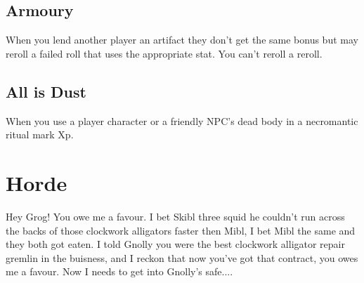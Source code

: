 \documentclass{tufte-book}
\begin{document}
\section{Armoury}
When you lend another player an artifact they don't get the same bonus but may reroll a failed roll that uses the appropriate stat. You can't reroll a reroll.

\section{All is Dust}
When you use a player character or a friendly NPC's dead body in a necromantic ritual mark Xp.



\chapter{Horde}

Hey Grog! You owe me a favour. I bet Skibl three squid he couldn't run across the backs of those clockwork alligators faster then Mibl, I bet Mibl the same and they both got eaten. I told Gnolly you were the best clockwork alligator repair gremlin in the buisness, and I reckon that now you've got that contract, you owes me a favour. Now I needs to get into Gnolly's safe....

\end{document}
